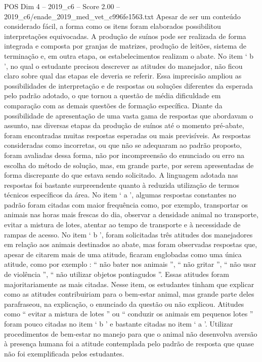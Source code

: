\begin{textsample}{POS Dim 4 – 2019\_c6 – Score 2.00 – 2019\_c6/enade\_2019\_med\_vet\_c996fe1563.txt}
Apesar de ser um conteúdo considerado fácil, a forma como os itens foram elaborados possibilitou interpretações equivocadas.
A produção de suínos pode ser realizada de forma integrada e composta por granjas de matrizes, produção de leitões, sistema de terminação e, em outra etapa, os estabelecimentos realizam o abate.
No item ‘ b ’, no qual o estudante precisou descrever as atitudes do manejador, não ficou claro sobre qual das etapas ele deveria se referir.
Essa imprecisão ampliou as possibilidades de interpretação e de respostas ou soluções diferentes da esperada pelo padrão adotado, o que tornou a questão de média dificuldade em comparação com as demais questões de formação específica.
Diante da possibilidade de apresentação de uma vasta gama de respostas que abordavam o assunto, nas diversas etapas da produção de suínos até o momento pré-abate, foram encontradas muitas respostas esperadas ou mais previsíveis.
As respostas consideradas como incorretas, ou que não se adequaram ao padrão proposto, foram avaliadas dessa forma, não por incompreensão do enunciado ou erro na escolha do método de solução, mas, em grande parte, por serem apresentadas de forma discrepante do que estava sendo solicitado.
A linguagem adotada nas respostas foi bastante surpreendente quanto à reduzida utilização de termos técnicos específicos da área.
No item ‘ a ’, algumas respostas constantes no padrão foram citadas com maior frequência como, por exemplo, transportar os animais nas horas mais frescas do dia, observar a densidade animal no transporte, evitar a mistura de lotes, atentar ao tempo de transporte e à necessidade de rampas de acesso.
No item ‘ b ’, foram solicitadas três atitudes dos manejadores em relação aos animais destinados ao abate, mas foram observadas respostas que, apesar de citarem mais de uma atitude, ficaram englobadas como uma única atitude, como por exemplo : “ não bater nos animais ”, “ não gritar ”, “ não usar de violência ”, “ não utilizar objetos pontiagudos ”.
Essas atitudes foram majoritariamente as mais citadas.
Nesse item, os estudantes tinham que explicar como as atitudes contribuiriam para o bem-estar animal, mas grande parte deles parafraseou, na explicação, o enunciado da questão ou não explicou.
Atitudes como “ evitar a mistura de lotes ” ou “ conduzir os animais em pequenos lotes ” foram pouco citadas no item ‘ b ’ e bastante citadas no item ‘ a ’.
Utilizar procedimentos de bem-estar no manejo para que o animal não desenvolva aversão à presença humana foi a atitude contemplada pelo padrão de resposta que quase não foi exemplificada pelos estudantes.

\end{textsample}
